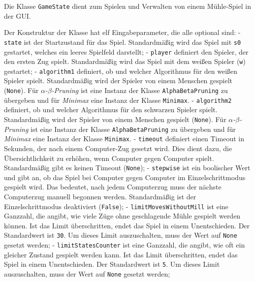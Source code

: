 \documentclass[11pt]{article}
\begin{document}
Die Klasse \texttt{GameState} dient zum Spielen und Verwalten von einem
Mühle-Spiel in der GUI.

Der Konstruktur der Klasse hat elf Eingabeparameter, die alle optional
sind: - \texttt{state} ist der Startzustand für das Spiel. Standardmäßig
wird das Spiel mit \texttt{s0} gestartet, welches ein leeres Spielfeld
darstellt; - \texttt{player} definiert den Spieler, der den ersten Zug
spielt. Standardmäßig wird das Spiel mit dem weißen Spieler (\texttt{w})
gestartet; - \texttt{algorithm1} definiert, ob und welcher Algorithmus
für den weißen Spieler spielt. Standardmäßig wird der Spieler von einem
Menschen gespielt (\texttt{None}). Für \emph{$\alpha$-$\beta$-Pruning} ist eine
Instanz der Klasse \texttt{AlphaBetaPruning} zu übergeben und für
\emph{Minimax} eine Instanz der Klasse \texttt{Minimax}. -
\texttt{algorithm2} definiert, ob und welcher Algorithmus für den
schwarzen Spieler spielt. Standardmäßig wird der Spieler von einem
Menschen gespielt (\texttt{None}). Für \emph{$\alpha$-$\beta$-Pruning} ist eine
Instanz der Klasse \texttt{AlphaBetaPruning} zu übergeben und für
\emph{Minimax} eine Instanz der Klasse \texttt{Minimax}. -
\texttt{timeout} definiert einen Timeout in Sekunden, der nach einem
Computer-Zug gesetzt wird. Dies dient dazu, die Übersichtlichkeit zu
erhöhen, wenn Computer gegen Computer spielt. Standardmäßig gibt es
keinen Timeout (\texttt{None}); - \texttt{stepwise} ist ein boolischer
Wert und gibt an, ob das Spiel bei Computer gegen Computer im
Einzelschrittmodus gespielt wird. Das bedeutet, nach jedem Computerzug
muss der nächste Computerzug manuell begonnen werden. Standardmäßig ist
der Einzelschrittmodus deaktiviert (\texttt{False}); -
\texttt{limitMovesWithoutMill} ist eine Ganzzahl, die angibt, wie viele
Züge ohne geschlagende Mühle gespielt werden können. Ist das Limit
überschritten, endet das Spiel in einem Unentschieden. Der Standardwert
ist \texttt{30}. Um dieses Limit auszuschalten, muss der Wert auf
\texttt{None} gesetzt werden; - \texttt{limitStatesCounter} ist eine
Ganzzahl, die angibt, wie oft ein gleicher Zustand gespielt werden kann.
Ist das Limit überschritten, endet das Spiel in einem Unentschieden. Der
Standardwert ist \texttt{5}. Um dieses Limit auszuschalten, muss der
Wert auf \texttt{None} gesetzt werden;
\end{document}
